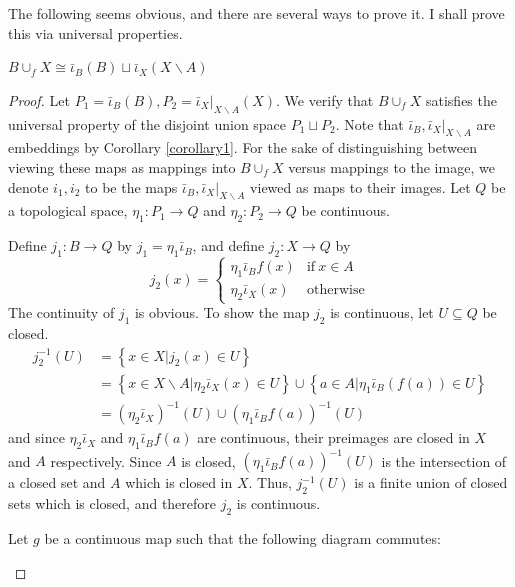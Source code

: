\documentclass[12pt,reqno]{amsart}
\numberwithin{theorem}{section}
\theoremstyle{definition}
\theoremstyle{remark}
\numberwithin{equation}{section}
\newcommand{\set}[1]{\left \{ #1 \right \}}
\theoremstyle{definition}
\begin{document}
The following seems obvious, and there are several ways to prove it. I shall prove this via universal properties.
\begin{proposition}
    $B\cup_f X \cong \bar \iota_B (B)\sqcup \bar \iota_{X}(X\backslash A)$
\end{proposition}
\begin{proof}
    Let $P_1= \bar \iota_B (B),P_2= \bar \iota_X|_{X\backslash A}(X)$. We verify that $B\cup_f X$ satisfies the universal property of the disjoint union space $P_1 \sqcup P_2$. Note that $\bar \iota_B, \bar \iota_X|_{X\backslash A}$ are embeddings by Corollary \ref{corollary1}. For the sake of distinguishing between viewing these maps as mappings into $B\cup_fX$ versus mappings to the image, we denote $i_1,i_2$ to be the maps $\bar \iota_B, \bar \iota_X|_{X\backslash A}$ viewed as maps to their images. Let $Q$ be a topological space, $\eta_1:P_1\rightarrow Q$ and $\eta_2:P_2\rightarrow Q$ be continuous. 

     Define $j_1:B \rightarrow Q$ by $j_1 = \eta_1\bar \iota_B$, and define $j_2:X \rightarrow Q$ by
    $$j_2(x) = \begin{cases}
        \eta_1 \bar \iota_B f(x) & \mathrm{if} \ x \in A \\
        \eta_2 \bar \iota_X(x) & \mathrm{otherwise}
    \end{cases}$$ 
    The continuity of $j_1$ is obvious. To show the map $j_2$ is continuous, let $U \subseteq Q$ be closed.
    \begin{align*}
        j_2^{-1}(U) &= \set{x \in X | j_2(x) \in U} \\
                    &= \set{x \in X \backslash A |\eta_2 \bar \iota_X(x) \in U} \cup \set{a \in A | \eta_1 \bar \iota_B (f(a)) \in U} \\
                    &= (\eta_{2}\bar \iota_X)^{-1}(U) \cup (\eta_1 \bar \iota_B f(a))^{-1}(U)
    \end{align*}
    and since $\eta_{2}\bar \iota_X$ and $\eta_1 \bar \iota_B f(a)$ are continuous, their preimages are closed in $X$ and $A$ respectively. Since $A$ is closed, $(\eta_1 \bar \iota_B f(a))^{-1}(U)$  is the intersection of a closed set and $A$ which is closed in $X$. Thus, $j_2^{-1}(U)$ is a finite union of closed sets which is closed, and therefore $j_2$ is continuous. 
    
    Let $g$ be a continuous map such that the following diagram commutes:
    \begin{center}
    \end{center}


\end{proof}
\end{document}
